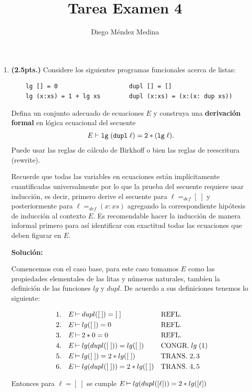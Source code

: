 \documentclass[11pt,letterpaper]{article}
\title{Tarea Examen 4}
\author{Diego Méndez Medina}
\date{}
\newcommand{\coso}{\mathbin{\rotatebox[origin=c]{270}{$\perp$}}}
\begin{document}
\maketitle

\begin{enumerate}

\item {\bf (2.5pts.)} Considere los siguientes programas funcionales acerca de listas:
\begin{verbatim}
    lg [] = 0                    dupl [] = []
    lg (x:xs) = 1 + lg xs        dupl (x:xs) = (x:(x: dup xs))
\end{verbatim}
Defina un conjunto adecuado de ecuaciones $E$ y construya una {\bf derivación formal} en lógica ecuacional del secuente \[ E\vdash {\tt lg\; (dupl\; \ell) = 2*(lg\; \ell)}. \] Puede usar las reglas de cálculo de Birkhoff o bien las reglas de reescritura ({\sc rewrite}).

Recuerde que todas las variables en ecuaciones están implícitamente cuantificadas universalmente por lo que la prueba del secuente requiere usar inducción, es decir, primero derive el secuente para 
$\ell=_{def}[\;]$ y posteriormente para $\ell=_{def}(x:xs)$ agregando la correspondiente hipótesis de inducción al contexto $E$. Es recomendable hacer la inducción de manera informal primero para así identificar con exactitud todas las ecuaciones que deben figurar en $E$. 

\hfill\break
{\bf Solución:}

Comencemos con el caso base, para este caso tomamos $E$ como las propiedades
elementales de las litas y números naturales, tambíen la definición de las
funciones $lg$ y $dupl$. De acuerdo a sus definiciones tenemos lo siguiente:

\begin{align*}
  1.& & E&\coso dupl([\:]) = [\;] & &\text{REFL.}\\
  2.& & E&\coso lg([\:]) = 0 & &\text{REFL.}\\
  3.& & E&\coso 2* 0=0 & &\text{REFL.}\\
  4.& & E&\coso lg(dupl([\;])) = lg([\;]) & &\text{CONGR.}\; lg\;(1) \\\
  5.& & E&\coso lg([\;]) = 2*lg([\;]) & &\text{TRANS. } 2,3\\
  6.& & E&\coso lg(dupl([\;])) = 2*lg([\;]) & &\text{TRANS. } 4,5\\
\end{align*}

Entonces para $\ell = [\;]$ se cumple $E\coso lg(dupl([\ell])) = 2*lg([\ell])$


\end{enumerate}
\end{document}
